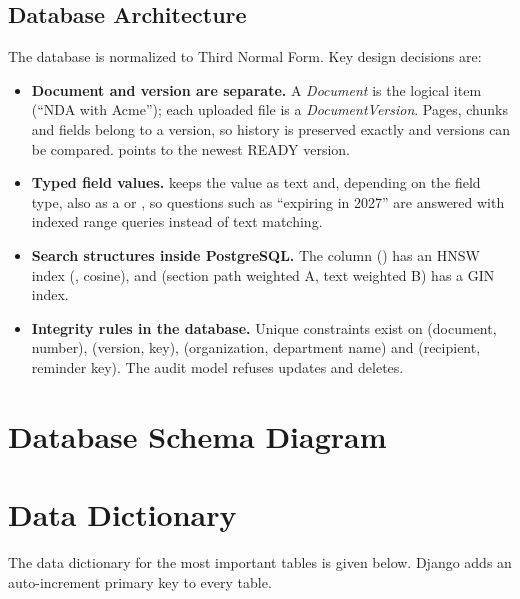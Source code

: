 \subsection{Database Architecture}
The database is normalized to Third Normal Form. Key design decisions are:
\begin{itemize}
\item \textbf{Document and version are separate.} A \emph{Document} is the logical item (``NDA with
Acme''); each uploaded file is a \emph{DocumentVersion}. Pages, chunks and fields belong to a version,
so history is preserved exactly and versions can be compared.  points to the
newest READY version.
\item \textbf{Typed field values.}  keeps the value as text and, depending on the field
type, also as a  or , so questions such as ``expiring in 2027'' are answered
with indexed range queries instead of text matching.
\item \textbf{Search structures inside PostgreSQL.} The  column ()
has an HNSW index (, cosine), and  (section path
weighted A, text weighted B) has a GIN index.
\item \textbf{Integrity rules in the database.} Unique constraints exist on (document, number),
(version, key), (organization, department name) and (recipient, reminder key). The audit model refuses
updates and deletes.
\end{itemize}

\section{Database Schema Diagram}

\section{Data Dictionary}
The data dictionary for the most important tables is given below. Django adds an auto-increment
primary key  to every table.

